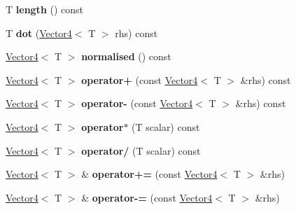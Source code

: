 \begin{DoxyCompactItemize}
\item 
\mbox{\label{class_vector4_a1c8ab62fe32713c21353d71a1b23b0f2}} 
T {\bfseries length} () const
\item 
\mbox{\label{class_vector4_ae9d1720458cdff4084f2f20dadbc0dd7}} 
T {\bfseries dot} (\mbox{\hyperlink{class_vector4}{Vector4}}$<$ T $>$ rhs) const
\item 
\mbox{\label{class_vector4_ab03ee378cc4b82bcb2429ca4fe7fe53b}} 
\mbox{\hyperlink{class_vector4}{Vector4}}$<$ T $>$ {\bfseries normalised} () const
\item 
\mbox{\label{class_vector4_a2a7fd8018536c8e7c61b8ee3975609f9}} 
\mbox{\hyperlink{class_vector4}{Vector4}}$<$ T $>$ {\bfseries operator+} (const \mbox{\hyperlink{class_vector4}{Vector4}}$<$ T $>$ \&rhs) const
\item 
\mbox{\label{class_vector4_a41cb957697e0e937e0f7f4a5d459575a}} 
\mbox{\hyperlink{class_vector4}{Vector4}}$<$ T $>$ {\bfseries operator-\/} (const \mbox{\hyperlink{class_vector4}{Vector4}}$<$ T $>$ \&rhs) const
\item 
\mbox{\label{class_vector4_ae808773615c6a150b3350744fc055f6a}} 
\mbox{\hyperlink{class_vector4}{Vector4}}$<$ T $>$ {\bfseries operator$\ast$} (T scalar) const
\item 
\mbox{\label{class_vector4_a0d7e9b8d9b2d7033d49271105945db94}} 
\mbox{\hyperlink{class_vector4}{Vector4}}$<$ T $>$ {\bfseries operator/} (T scalar) const
\item 
\mbox{\label{class_vector4_a0c84d5598e0a4e4421184ddc751d710b}} 
\mbox{\hyperlink{class_vector4}{Vector4}}$<$ T $>$ \& {\bfseries operator+=} (const \mbox{\hyperlink{class_vector4}{Vector4}}$<$ T $>$ \&rhs)
\item 
\mbox{\label{class_vector4_a14caed9a7066f773974ab3bc5fb5e483}} 
\mbox{\hyperlink{class_vector4}{Vector4}}$<$ T $>$ \& {\bfseries operator-\/=} (const \mbox{\hyperlink{class_vector4}{Vector4}}$<$ T $>$ \&rhs)
\item 
\mbox{\label{class_vector4_a3d716714c9bb1d78afb0fbc3df1b4f6a}} 

\end{DoxyCompactItemize}

